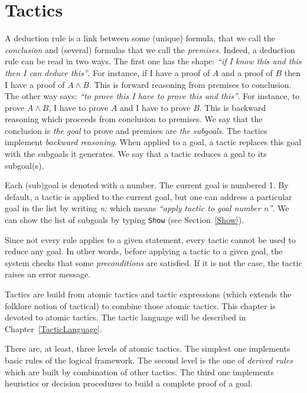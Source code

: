 \chapter{Tactics
\label{Tactics}}

A deduction rule is a link between some (unique) formula, that we call
the {\em conclusion} and (several) formulas that we call the {\em
premises}. Indeed, a deduction rule can be read in two ways. The first
one has the shape: {\it ``if I know this and this then I can deduce
this''}. For instance, if I have a proof of $A$ and a proof of $B$
then I have a proof of $A \land B$. This is forward reasoning from
premises to conclusion. The other way says: {\it ``to prove this I
have to prove this and this''}. For instance, to prove $A \land B$, I
have to prove $A$ and I have to prove $B$. This is backward reasoning
which proceeds from conclusion to premises. We say that the conclusion
is {\em the goal} to prove and premises are {\em the
subgoals}.  The tactics implement {\em backward
reasoning}. When applied to a goal, a tactic replaces this goal with
the subgoals it generates. We say that a tactic reduces a goal to its
subgoal(s).

Each (sub)goal is denoted with a number. The current goal is numbered
1. By default, a tactic is applied to the current goal, but one can
address a particular goal in the list by writing {\sl n:\tac} which
means {\it ``apply tactic {\tac} to goal number {\sl n}''}.
We can show the list of subgoals by typing {\tt Show} (see
Section~\ref{Show}). 

Since not every rule applies to a given statement, every tactic cannot be
used to reduce any goal. In other words, before applying a tactic to a
given goal, the system checks that some {\em preconditions} are
satisfied. If it is not the case, the tactic raises an error message.

Tactics are build from atomic tactics and tactic expressions (which
extends the folklore notion of tactical) to combine those atomic
tactics. This chapter is devoted to atomic tactics. The tactic
language will be described in Chapter~\ref{TacticLanguage}.

There are, at least, three levels of atomic tactics. The simplest one
implements basic rules of the logical framework. The second level is
the one of {\em derived rules} which are built by combination of other
tactics. The third one implements heuristics or decision procedures to
build a complete proof of a goal.

